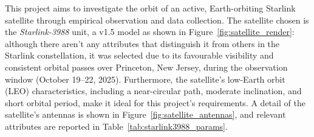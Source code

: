 \documentclass{article}
\begin{document}
This project aims to investigate the orbit of an active, Earth-orbiting Starlink satellite through empirical observation and data collection. The satellite chosen is the \textit{Starlink-3988} unit, a v1.5 model as shown in Figure~\ref{fig:satellite_render}: although there aren't any attributes that distinguish it from others in the Starlink constellation, it was selected due to its favourable visibility and consistent orbital passes over Princeton, New Jersey, during the observation window (October 19–22, 2025). Furthermore, the satellite’s low-Earth orbit (LEO) characteristics, including a near-circular path, moderate inclination, and short orbital period, make it ideal for this project's requirements. A detail of the satellite's antennas is shown in Figure~\ref{fig:satellite_antennas}, and relevant attributes are reported in Table~\ref{tab:starlink3988_params}.
\end{document}

